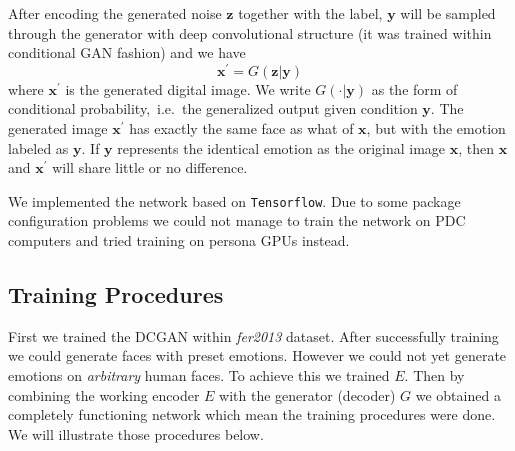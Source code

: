 \documentclass[runningheads]{llncs}
\begin{document}
After encoding the generated noise $\textbf{z}$ together with the label, $\textbf{y}$ will be sampled through the generator with deep convolutional structure (it was trained within conditional GAN fashion) and we have
\begin{equation}
\textbf{x}^{\prime}=G(\textbf{z}|\textbf{y})
\end{equation}
where $\textbf{x}^{\prime}$ is the generated digital image. We write $G(\cdot|\mathbf{y})$ as the form of conditional probability,\ i.e.~the generalized output given condition $\mathbf{y}$. The generated image $\textbf{x}^{\prime}$ has exactly the same face as what of $\textbf{x}$, but with the emotion labeled as $\textbf{y}$. If $\textbf{y}$ represents the identical emotion as the original image $\textbf{x}$, then $\textbf{x}$ and $\textbf{x}^{\prime}$ will share little or no difference.

We implemented the network based on \texttt{Tensorflow}. Due to some package configuration problems we could not manage to train the network on PDC computers and tried training on persona GPUs instead.

\subsection{Training Procedures}
First we trained the DCGAN within \textit{fer2013} dataset. After successfully training we could generate faces with preset emotions. However we could not yet generate emotions on \textit{arbitrary} human faces. To achieve this we trained $E$. Then by combining the working encoder $E$ with the generator (decoder) $G$ we obtained a completely functioning network which mean the training procedures were done. We will illustrate those procedures below.
\end{document}
